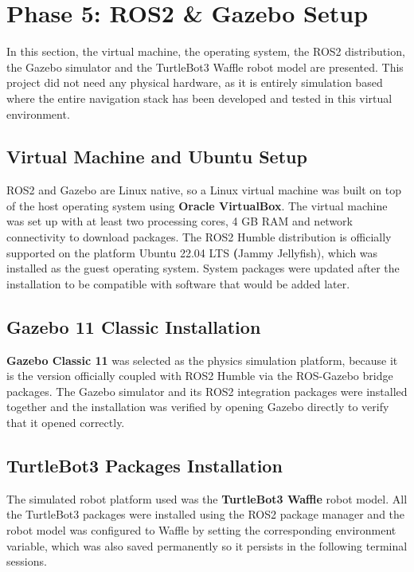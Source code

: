\section{Phase 5: ROS2 \& Gazebo Setup}
\label{sec:phase5_ros2_gazebo}

In this section, the virtual machine, the operating system, the ROS2 distribution, the Gazebo simulator and the TurtleBot3 Waffle robot model are presented. This project did not need any physical hardware, as it is entirely simulation based where the entire navigation stack has been developed and tested in this virtual environment.


\subsection{Virtual Machine and Ubuntu Setup}
\label{subsec:vm_ubuntu_setup}

ROS2 and Gazebo are Linux native, so a Linux virtual machine was built on top of the host operating system using \textbf{Oracle VirtualBox}. The virtual machine was set up with at least two processing cores, 4 GB RAM and network connectivity to download packages. The ROS2 Humble distribution is officially supported on the platform Ubuntu 22.04 LTS \textbf(Jammy Jellyfish), which was installed as the guest operating system. System packages were updated after the installation to be compatible with software that would be added later.

\subsection{Gazebo 11 Classic Installation} \label{subsec:gazebo_install} \textbf{Gazebo Classic 11} was selected as the physics simulation platform, because it is the version officially coupled with ROS2 Humble via the ROS-Gazebo bridge packages. 
The Gazebo simulator and its ROS2 integration packages were installed together and the installation was verified by opening Gazebo directly to verify that it opened correctly. \subsection{TurtleBot3 Packages Installation} \label{subsec:turtlebot3_install} The simulated robot platform used was the \textbf{TurtleBot3 Waffle} robot model. All the TurtleBot3 packages were installed using the ROS2 package manager and the robot model was configured to Waffle by setting the corresponding environment variable, which was also saved permanently so it persists in the following terminal sessions.
